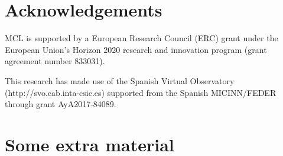 \documentclass[fleqn,usenatbib]{rasti}
\begin{document}
\section*{Acknowledgements}
MCL is supported by a European Research Council (ERC) grant under the European
Union’s Horizon 2020 research and innovation program (grant agreement number
833031).

This research has made use of the Spanish Virtual Observatory
(http://svo.cab.inta-csic.es) supported from the Spanish MICINN/FEDER through
grant AyA2017-84089.











\appendix

\section{Some extra material}



\bsp	%
\label{lastpage}
\end{document}
